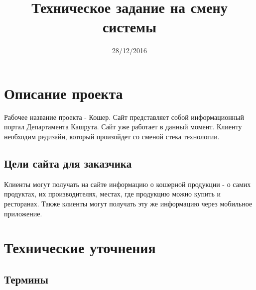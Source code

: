 \documentclass[DIV=calc, paper=a4, fontsize=11pt]{scrartcl} %
\title{Техническое задание на смену системы}
\date{28/12/2016}
\begin{document}
\maketitle

\section{Описание проекта}
Рабочее название проекта - Кошер. Сайт представляет собой информационный портал Департамента Кашрута. Сайт уже работает в данный момент. Клиенту необходим редизайн, который произойдет со сменой стека технологии.

\subsection{Цели сайта для заказчика}

Клиенты могут получать на сайте информацию о кошерной продукции - о самих продуктах, их производителях, местах, где продукцию можно купить и ресторанах. Также клиенты могут получать эту же информацию через мобильное приложение.


\section{Технические уточнения}

\subsection{Термины}
\end{document}
